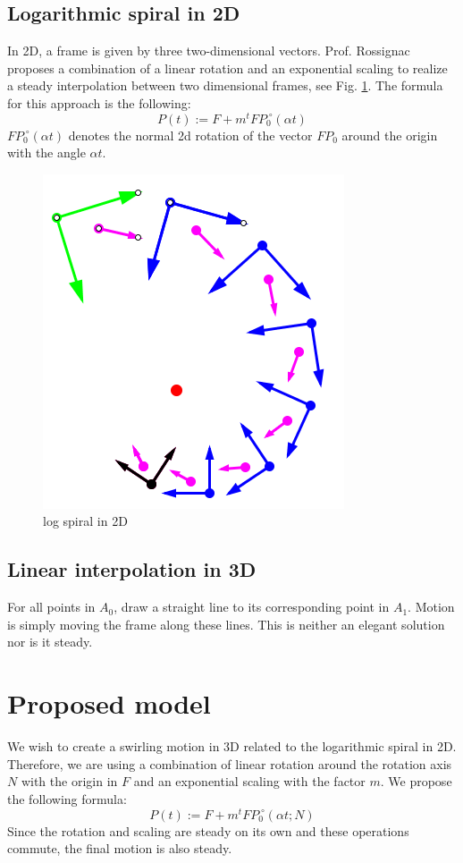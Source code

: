 \documentclass[journal, letterpaper]{IEEEtran}
\begin{document}
\subsection{Logarithmic spiral in 2D}
In 2D, a frame is given by three two-dimensional vectors. Prof. Rossignac proposes a combination of a linear rotation and an exponential scaling to realize a steady interpolation between two dimensional frames, see Fig. \ref{fig:P6}.
The formula for this approach is the following:
\begin{equation}
 P(t) := F + m^t FP_0 ^{\;\circ} (\alpha t)
\label{eq:logSpiral}
\end{equation}
$FP_0 ^{\;\circ} (\alpha t)$ denotes the normal 2d rotation of the vector $FP_0$ around the origin with the angle $\alpha t$.
\begin{figure}[H]
	\centering
		\includegraphics[scale=0.4]{pictures/P6.png}
	\caption{log spiral in 2D}
	\label{fig:P6}
\end{figure}

\subsection{Linear interpolation in 3D}
For all points in $A_0$, draw a straight line to its corresponding point in $A_1$. Motion is simply moving the frame along these lines.  This is neither an elegant solution nor is it steady.

\section{Proposed model}
We wish to create a swirling motion in 3D related to the logarithmic spiral in 2D. Therefore, we are using a combination of linear rotation around the rotation axis $N$ with the origin in $F$ and an exponential scaling with the factor $m$. We propose the following formula:
\begin{equation}
 P(t) := F + m^t FP_0 ^{\;\circ} (\alpha t; N)
\label{eq:Interpolation}
\end{equation}
Since the rotation and scaling are steady on its own and these operations commute, the final motion is also steady.
\end{document}
